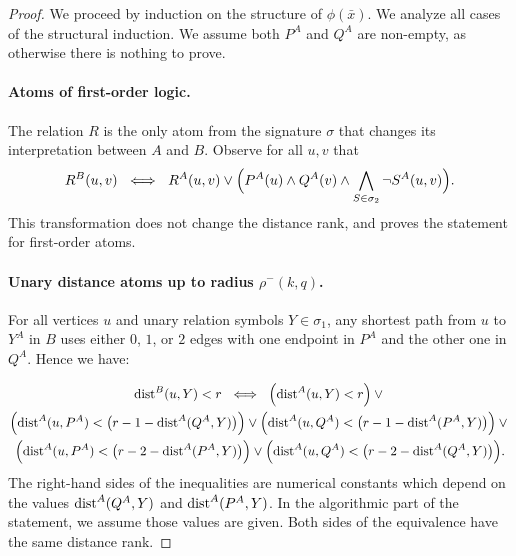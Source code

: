 \begin{proof}%
We proceed by induction on the structure of $\phi(\bar x)$.
    We analyze all cases of the structural induction. We assume both $P^A$ and $Q^A$ are non-empty, as otherwise there is nothing to prove.


    \paragraph{Atoms of first-order logic.}
    The relation \(R\) is the only atom from the signature $\sigma$ that changes its interpretation between \(A\) and \(B\).
    Observe for all \(u,v\) that
    \[
        R^{{B}}(u,v) ~\iff~ R^{{A}}(u,v) \lor \Bigl(P^{{A}}(u) \land Q^{{A}}(v) \land \bigwedge_{S\in\sigma_2} \neg S^{{A}}(u,v)\Bigr).
    \]
    This transformation does not change the distance rank, and proves the statement for first-order atoms.

    \paragraph{Unary distance atoms up to radius \(\rho^-(k,q)\).}
    For all vertices \(u\) and unary relation symbols \(Y\in \sigma_1\),
    any shortest path from $u$ to $Y^A$ in $B$ uses either $0$, $1$, or $2$ edges with one endpoint in $P^A$ and the other one in $Q^A$. Hence we have:

    \begin{multline*}
      \mathrm{dist}^{B}(u,Y) < r ~\iff~\Bigl(\mathrm{dist}^{A}(u,Y) < r\Bigr)\lor {}\\ \Bigl(\mathrm{dist}^{A}(u,P^{A}) < \bigl(r - 1 - \mathrm{dist}^{A}(Q^{A},Y)\bigr) \Bigr)
                            \lor  \Bigl(\mathrm{dist}^{A}(u,Q^{A}) < \bigl(r - 1 - \mathrm{dist}^{A}(P^{A},Y)\bigr) \Bigr)\lor {}\\
                            \Bigl(\mathrm{dist}^{A}(u,P^{A}) < \bigl(r - 2 - \mathrm{dist}^{A}(P^{A},Y)\bigr) \Bigr)
                            \lor  \Bigl(\mathrm{dist}^{A}(u,Q^{A}) < \bigl(r - 2 - \mathrm{dist}^{A}(Q^{A},Y)\bigr) \Bigr).
    \end{multline*}
    The right-hand sides of the inequalities are numerical constants which depend on the values \(\mathrm{dist}^{A}(Q^{A},Y)\) and \(\mathrm{dist}^{A}(P^{A},Y)\). In the algorithmic part of the statement, we assume those values are given.
    Both sides of the equivalence have the same distance rank.


\end{proof}
